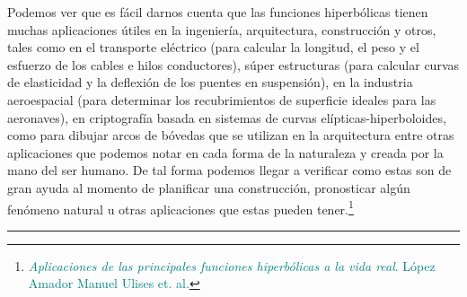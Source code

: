 Podemos  ver  que  es  fácil  darnos  cuenta  que  las  funciones  hiperbólicas  tienen muchas aplicaciones útiles en la ingeniería, arquitectura, construcción y otros, tales como en el transporte eléctrico (para calcular la longitud, el peso y el esfuerzo de los cables e hilos conductores), súper estructuras (para calcular curvas de elasticidad y la deflexión de  los  puentes  en  suspensión),  en  la  industria  aeroespacial  (para  determinar  los recubrimientos  de  superficie  ideales  para  las  aeronaves),  en  criptografía  basada  en sistemas de curvas elípticas-hiperboloides, como para dibujar arcos de bóvedas que se utilizan en la arquitectura entre otras aplicaciones que podemos notar en cada forma de la naturaleza y creada por la mano del ser humano. De tal forma podemos llegar a verificar como estas son de gran ayuda al momento de planificar una construcción, pronosticar algún fenómeno natural u otras aplicaciones que estas pueden tener.\footnote{\textcolor{teal}{\emph{Aplicaciones de las principales funciones hiperbólicas a la vida real}. López Amador Manuel Ulises et. al.}}

\begin{flushright}
\rule{250pt}{0.2pt}		
\end{flushright}
\color{black}


